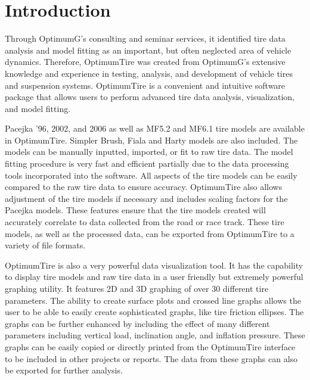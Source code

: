 
\chapter*{Introduction}
\label{sec:Introduction}

Through OptimumG's consulting and seminar services, it identified tire data analysis and model fitting as an important, but often neglected area of vehicle dynamics. Therefore, OptimumTire was created from OptimumG's extensive knowledge and experience in testing, analysis, and development of vehicle tires and suspension systems. OptimumTire is a convenient and intuitive software package that allows users to perform advanced tire data analysis, visualization, and model fitting. 

Pacejka '96, 2002, and 2006 as well as MF5.2 and MF6.1 tire models are available in OptimumTire. Simpler Brush, Fiala and Harty models are also included. The models can be manually inputted, imported, or fit to raw tire data. The model fitting procedure is very fast and efficient partially due to the data processing tools incorporated into the software. All aspects of the tire models can be easily compared to the raw tire data to ensure accuracy. OptimumTire also allows adjustment of the tire models if necessary and includes scaling factors for the Pacejka models. These features ensure that the tire models created will accurately correlate to data collected from the road or race track. These tire models, as well as the processed data, can be exported from OptimumTire to a variety of file formats.

OptimumTire is also a very powerful data visualization tool.  It has the capability to display tire models and raw tire data in a user friendly but extremely powerful graphing utility. It features 2D and 3D graphing of over 30 different tire parameters. The ability to create surface plots and crossed line graphs allows the user to be able to easily create sophisticated graphs, like tire friction ellipses. The graphs can be further enhanced by including the effect of many different parameters including vertical load, inclination angle, and inflation pressure. These graphs can be easily copied or directly printed from the OptimumTire interface to be included in other projects or reports. The data from these graphs can also be exported for further analysis.